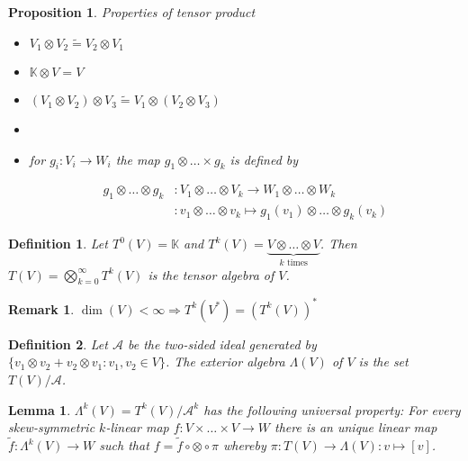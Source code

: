 \documentclass{scrartcl}
\newtheorem*{mydef}{Definition}
\newtheorem*{lemma}{Lemma}
\newtheorem*{prop}{Proposition}
\newtheorem*{remark}{Remark}
\begin{document}
\begin{prop}
  Properties of tensor product

  \begin{itemize}
  \item $V_1 \otimes V_2 \tilde= V_2 \otimes V_1$
  \item $\mathbb K \otimes V = V$
  \item $(V_1 \otimes V_2) \otimes V_3 \tilde= V_1 \otimes (V_2 \otimes V_3)$
  \item
  \item for $g_i: V_i \rightarrow W_i$ the map $g_1\otimes \dots \times g_k$ is defined by

    \begin{align}
      g_1\otimes\dots\otimes g_k& :V_1\otimes\dots\otimes V_k\rightarrow W_1\otimes \dots \otimes W_k\\
      & :v_1\otimes \dots \otimes v_k \mapsto g_1(v_1) \otimes \dots \otimes g_k(v_k)
    \end{align}
  \end{itemize}
\end{prop}

\begin{mydef}
  Let $T^0(V) = \mathbb K$ and $T^k(V) = \underbrace{V\otimes\dots \otimes V}_{k\text{ times}}$. Then $T(V) = \bigotimes_{k=0}^\infty T^k(V)$ is the \emph{tensor algebra} of $V$.
\end{mydef}

\begin{remark}
  $\operatorname{dim}(V) < \infty \Rightarrow T^k(V^*)=\left(T^k(V)\right)^*$
\end{remark}

\begin{mydef}
  Let $\mathcal A$ be the two-sided ideal generated by $\{v_1\otimes v_2 + v_2 \otimes v_1:v_1,v_2\in V\}$. The \emph{exterior algebra} $\Lambda(V)$ of $V$ is the set $T(V)/\mathcal A$.
\end{mydef}

\begin{lemma}
  $\Lambda^k(V)=T^k(V)/\mathcal A^k$ has the following universal property: For every skew-symmetric $k$-linear map $f:V\times\dots\times V \rightarrow W$ there is an unique linear map $\tilde f:\Lambda^k(V)\rightarrow W$ such that $f = \tilde f \circ \otimes \circ \pi$ whereby $\pi:T(V)\rightarrow \Lambda(V):v\mapsto [v]$.
\end{lemma}
\end{document}
